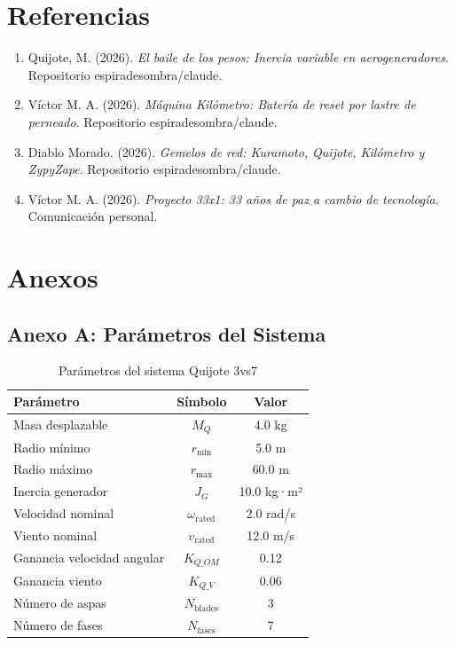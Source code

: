\documentclass[12pt,a4paper]{article}
\begin{document}
\section{Referencias}

\begin{enumerate}
    \item Quijote, M. (2026). \textit{El baile de los pesos: Inercia variable en aerogeneradores}. Repositorio espiradesombra/claude.
    \item Víctor M. A. (2026). \textit{Máquina Kilómetro: Batería de reset por lastre de perneado}. Repositorio espiradesombra/claude.
    \item Diablo Morado. (2026). \textit{Gemelos de red: Kuramoto, Quijote, Kilómetro y ZypyZape}. Repositorio espiradesombra/claude.
    \item Víctor M. A. (2026). \textit{Proyecto 33x1: 33 años de paz a cambio de tecnología}. Comunicación personal.
\end{enumerate}

\section{Anexos}

\subsection{Anexo A: Parámetros del Sistema}

\begin{table}[H]
\centering
\caption{Parámetros del sistema Quijote 3vs7}
\label{tab:parametros}
\begin{tabular}{@{}lcc@{}}
\toprule
\textbf{Parámetro} & \textbf{Símbolo} & \textbf{Valor} \\
\midrule
Masa desplazable & $M_Q$ & 4.0 kg \\
Radio mínimo & $r_{\text{min}}$ & 5.0 m \\
Radio máximo & $r_{\text{max}}$ & 60.0 m \\
Inercia generador & $J_G$ & 10.0 kg·m² \\
Velocidad nominal & $\omega_{\text{rated}}$ & 2.0 rad/s \\
Viento nominal & $v_{\text{rated}}$ & 12.0 m/s \\
Ganancia velocidad angular & $K_{Q\_OM}$ & 0.12 \\
Ganancia viento & $K_{Q\_V}$ & 0.06 \\
Número de aspas & $N_{\text{blades}}$ & 3 \\
Número de fases & $N_{\text{fases}}$ & 7 \\
\bottomrule
\end{tabular}
\end{table}
\end{document}
